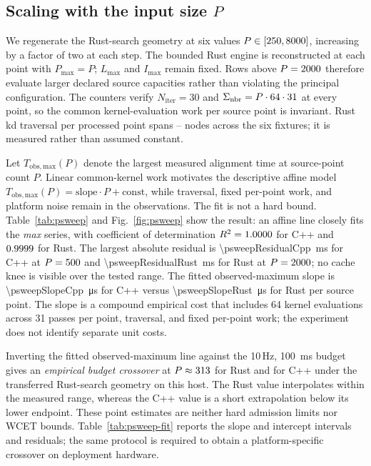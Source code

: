 

\subsection{Scaling with the input size \texorpdfstring{$P$}{P}}
\label{sec:eval-psweep}
We regenerate the Rust-search geometry at six values
$P\in[\num{250}{},\num{8000}{}]$, increasing by a factor of two at each step. The
bounded Rust engine is reconstructed at each point with $P_{\max}=P$; $L_{\max}$ and
$I_{\max}$ remain fixed. Rows above $P=2000$ therefore evaluate larger declared
source capacities rather than violating the principal configuration. The counters verify
$N_{\mathrm{iter}}=30$ and $\Sigma_{\mathrm{nbr}}=P\cdot64\cdot31$ at every point, so the common
kernel-evaluation work per source point is invariant. Rust kd traversal per processed point
spans \psweepKdPerPointMin--\psweepKdPerPointMax{} nodes across the six fixtures; it is
measured rather than assumed constant.

Let $T_{\mathrm{obs,max}}(P)$ denote the largest measured alignment time at source-point
count $P$. Linear common-kernel work motivates the descriptive affine model
$T_{\mathrm{obs,max}}(P)=\mathrm{slope}\cdot P+\mathrm{const}$, while traversal,
fixed per-point work, and platform noise remain in the observations. The fit is not a hard
bound.
Table~\ref{tab:psweep} and Fig.~\ref{fig:psweep} show the result: an affine line closely fits
the \emph{max} series, with coefficient of determination $R^2 = 1.0000{}$ for C++ and
$0.9999{}$ for Rust. The largest absolute residual is
\SI{\psweepResidualCpp}{ms} for C++ at $P=\num{500}{}$ and
\SI{\psweepResidualRust}{ms} for Rust at $P=\num{2000}{}$; no cache knee is
visible over the tested range. The fitted
observed-maximum slope is
\SI{\psweepSlopeCpp}{\micro\second} for C++ versus
\SI{\psweepSlopeRust}{\micro\second} for Rust
per source point. The slope is a compound empirical cost that includes 64 kernel
evaluations across 31 passes per point, traversal, and fixed per-point work; the experiment
does not identify separate unit costs.

Inverting the fitted observed-maximum line against the 10\,Hz, \SI{100}{ms} budget gives an
\emph{empirical budget crossover} at $P \approx \num{313}{}$ for Rust and
\psweepCrossCpp{} for C++ under the transferred Rust-search geometry on this host. The Rust
value interpolates within the measured range, whereas the C++ value is a short extrapolation
below its lower endpoint. These point estimates are neither hard admission limits nor WCET
bounds. Table~\ref{tab:psweep-fit} reports the slope and intercept intervals and residuals;
the same protocol is required to obtain a platform-specific crossover on deployment
hardware.

